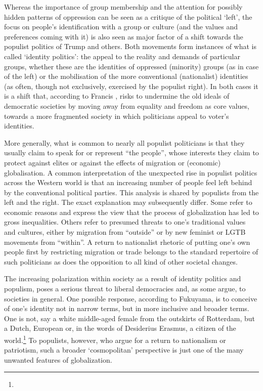 \documentclass[11pt]{article}
\begin{document}
Whereas the importance of group membership and the attention for possibly hidden patterns of oppression can be seen as a critique of the political ‘left’,
the focus on people’s identification with a group or culture (and the values and preferences coming with it) is also seen as major factor of a shift towards the populist politics of Trump and others. Both movements form instances of what is called ‘identity politics’: the appeal to the reality and demands of particular groups, whether these are the identities of oppressed (minority) groups (as in case of the left) or the mobilisation of the more conventional (nationalist) identities
(as often, though not exclusively, exercised by the populist right). In both cases it is a shift that, according to Francis \textcite{Fukuyama2018}, risks to undermine the old ideals of democratic societies by moving away from equality and freedom as core values, towards a more fragmented society in which politicians appeal to voter’s identities.


More generally, what is common to nearly all populist politicians is that they usually claim to speak for or represent “the people”, whose interests they claim to protect against elites or against the effects of migration or (economic)
globalisation. A common interpretation of the unexpected rise in populist politics across the Western world is that an increasing number of people feel left behind by the conventional political parties. This analysis is shared by populists from the left and the right. The exact explanation may subsequently differ. Some refer to economic reasons and express the view that the process of globalization has led to gross inequalities. Others refer to presumed threats to one’s traditional values and cultures, either by migration from “outside” or by new feminist or LGTB movements from “within”. A return to nationalist rhetoric of putting one’s own people first by restricting migration or trade belongs to the standard repertoire of such politicians as does the opposition to all kind of other societal changes.

The increasing polarization within society as a result of identity politics and populism, poses a serious threat to liberal democracies and, as some argue,
to societies in general. One possible response, according to Fukuyama, is to conceive of one’s identity not in narrow terms, but in more inclusive and broader terms. One is not, say a white middle-aged female from the outskirts of Rotterdam, but a Dutch, European or, in the words of Desiderius Erasmus, a citizen of the world.\footnote{} To populists, however, who argue for a return to nationalism or patriotism, such a broader ‘cosmopolitan’ perspective is just one of the many unwanted features of globalization.
\end{document}
